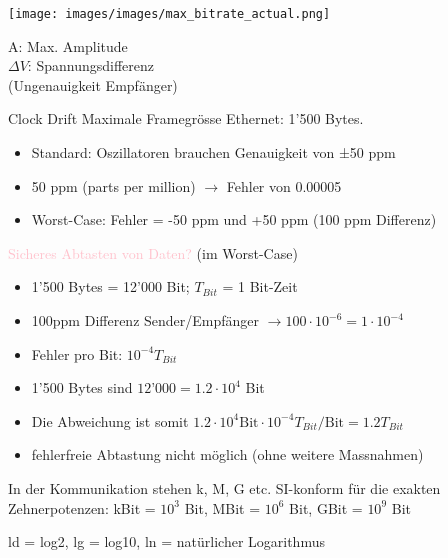 \begin{minipage}{0.65\linewidth}
    \texttt{[image: images/images/max\_bitrate\_actual.png]}
\end{minipage}
\begin{minipage}{0.34\linewidth}
    {\footnotesize A: Max. Amplitude\\ $\Delta V$: Spannungsdifferenz\\(Ungenauigkeit Empfänger)}
\end{minipage}
    

\begin{KR}{Clock Drift}
    Maximale Framegrösse Ethernet: 1’500 Bytes.
    \begin{itemize}
        \item Standard: Oszillatoren brauchen Genauigkeit von ±50 ppm 
        \item 50 ppm (parts per million) $\rightarrow$ Fehler von 0.00005
        \item Worst-Case: Fehler = -50 ppm und +50 ppm (100 ppm Differenz)
    \end{itemize}
    \textcolor{pink}{Sicheres Abtasten von Daten?} (im Worst-Case)
    \begin{itemize}
        \item 1'500 Bytes = 12'000 Bit; $T_{Bit}$ = 1 Bit-Zeit
        \item 100ppm Differenz Sender/Empfänger $\rightarrow 100 \cdot 10^{-6} = 1 \cdot 10^{-4}$
        \item Fehler pro Bit: $10^{-4} T_{Bit}$
        \item 1’500 Bytes sind $12’000 = 1.2 \cdot 10^4$ Bit
        \item Die Abweichung ist somit $1.2 \cdot 10^4 \text{Bit} \cdot 10^{-4} T_{Bit} / \text{Bit} = 1.2 T_{Bit}$
        \item fehlerfreie Abtastung nicht möglich (ohne weitere Massnahmen)
    \end{itemize}
\end{KR}

\begin{remark}
    In der Kommunikation stehen k, M, G etc. SI-konform für die exakten Zehnerpotenzen:
        kBit = $10^3$ Bit, MBit = $10^6$ Bit, GBit = $10^9$ Bit

        {\small ld = log2, lg = log10, ln = natürlicher Logarithmus}
\end{remark}





